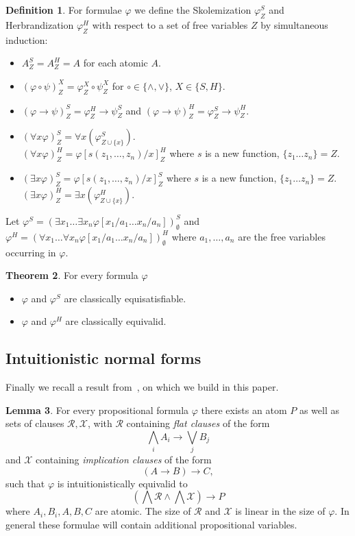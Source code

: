 \documentclass{easychair}
\theoremstyle{definition}
\newtheorem{theorem}{Theorem}[section]
\theoremstyle{definition}
\theoremstyle{definition}
\newtheorem{lemma}[theorem]{Lemma}
\theoremstyle{definition}
\theoremstyle{definition}
\newtheorem{definition}[theorem]{Definition}
\theoremstyle{definition}
\theoremstyle{definition}
\begin{document}
\begin{definition}\label{definition:skolemization}
	For formulae $\varphi$ we define the Skolemization $\varphi^S_Z$ and Herbrandization $\varphi^H_Z$ with respect to a set of free variables $Z$ by simultaneous induction:
	\begin{itemize}
		\item $A^S_Z = A^H_Z = A$ for each atomic $A$.
		\item $(\varphi\circ\psi)^X_Z = \varphi^X_Z\circ\psi^X_Z$ for $\circ\in\{\wedge, \vee\}$, $X\in\{S, H\}$.
		\item $(\varphi\to\psi)^S_Z = \varphi^H_Z\to \psi^S_Z$ and $(\varphi\to\psi)^H_Z = \varphi^S_Z\to\psi^H_Z$.
		\item $(\forall x\varphi)^S_Z = \forall x(\varphi^S_{Z\cup\{x\}})$.\\$(\forall x\varphi)^H_Z = \varphi[s(z_1,\dots,z_n)/x]^H_Z$ where $s$ is a new function, $\{z_1\dots z_n\} = Z$.
		\item $(\exists x\varphi)^S_Z = \varphi[s(z_1,\dots,z_n)/x]^S_Z$ where $s$ is a new function, $\{z_1\dots z_n\} = Z$.\\$(\exists x\varphi)^H_Z = \exists x(\varphi^H_{Z\cup\{x\}})$.
	\end{itemize}
	Let $\varphi^S = (\exists x_1\dots\exists x_n \varphi[x_1/a_1\dots x_n/a_n])^S_\emptyset$ and $\varphi^H = (\forall x_1\dots\forall x_n \varphi[x_1/a_1\dots x_n/a_n])^H_\emptyset$ where $a_1,\dots,a_n$ are the free variables occurring in $\varphi$.
\end{definition}

\begin{theorem}
	\label{thm:herbrand-skolem}
	For every formula $\varphi$
	\begin{itemize}
		\item $\varphi$ and $\varphi^S$ are classically equisatisfiable.
		\item $\varphi$ and $\varphi^H$ are classically equivalid.
	\end{itemize}
\end{theorem}


\subsection{Intuitionistic normal forms}

Finally we recall a result from~\cite{otten2005clausal}, on which we build in this paper.

\begin{lemma}\label{lemma:propositional-normal-form}
	For every propositional formula $\varphi$ there exists an atom $P$ as well as sets of clauses $\mathcal R, \mathcal X$, with $\mathcal R$ containing  \emph{flat clauses} of the form
	$$\bigwedge_iA_i\to\bigvee_jB_j$$
	and $\mathcal X$ containing \emph{implication clauses} of the form
	$$(A\to B)\to C,$$
	such that $\varphi$ is intuitionistically equivalid to
	$$\left(\bigwedge\mathcal R\wedge\bigwedge\mathcal X\right)\to P$$where $A_i, B_i, A, B, C$ are atomic. The size of $\mathcal R$ and $\mathcal X$ is linear in the size of $\varphi$. In general these formulae will contain additional propositional variables.
\end{lemma}
\end{document}
